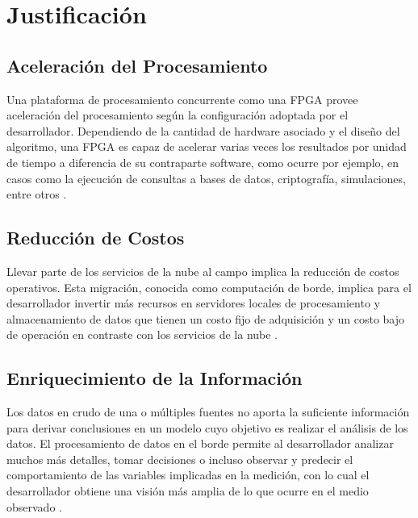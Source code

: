 
\chapter{Justificación} %
\label{Chapter4}
\section{Aceleración del Procesamiento}

Una plataforma de procesamiento concurrente como una FPGA provee aceleración del procesamiento según la configuración adoptada por el desarrollador. Dependiendo de la cantidad de hardware asociado y el diseño del algoritmo, una FPGA es capaz de acelerar varias veces los resultados por unidad de tiempo a diferencia de su contraparte software, como ocurre por ejemplo, en casos como la ejecución de consultas a bases de datos, criptografía, simulaciones, entre otros \citep{salami2017axledb,liu2017elliptic,mingas2016particle,FogEngine}.

\section{Reducción de Costos}

Llevar parte de los servicios de la nube al campo implica la reducción de costos operativos. Esta migración, conocida como computación de borde, implica para el desarrollador invertir más recursos en servidores locales de procesamiento y almacenamiento de datos que tienen un costo fijo de adquisición y un costo bajo de operación en contraste con los servicios de la nube \citep{FogBonomi,AzurePrice}.

\section{Enriquecimiento de la Información}

Los datos en crudo de una o múltiples fuentes no aporta la suficiente información para derivar conclusiones en un modelo cuyo objetivo es realizar el análisis de los datos. El procesamiento de datos en el borde permite al desarrollador analizar muchos más detalles, tomar decisiones o incluso observar y predecir el comportamiento de las variables implicadas en la medición, con lo cual el desarrollador obtiene una visión más amplia de lo que ocurre en el medio observado \citep{perera2014context,mahmoudi2015object,abrardo2017information}.

